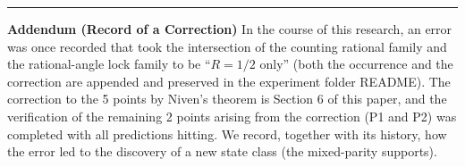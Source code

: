 \documentclass[
  a4paper,
]{article}
\begin{document}
\begin{center}\rule{0.5\linewidth}{0.5pt}\end{center}

\textbf{Addendum (Record of a Correction)} In the course of this
research, an error was once recorded that took the intersection of the
counting rational family and the rational-angle lock family to be
``\(R=1/2\) only'' (both the occurrence and the correction are appended
and preserved in the experiment folder README). The correction to the 5
points by Niven's theorem is Section 6 of this paper, and the
verification of the remaining 2 points arising from the correction (P1
and P2) was completed with all predictions hitting. We record, together
with its history, how the error led to the discovery of a new state
class (the mixed-parity supports).
\end{document}
